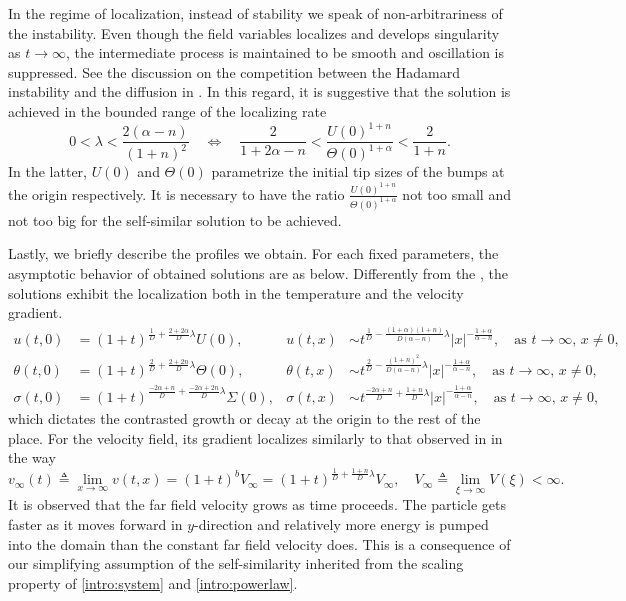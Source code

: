 \documentclass[a4paper,11pt]{article}
\begin{document}
In the regime of localization, instead of stability we speak of non-arbitrariness of the instability. Even though the field variables localizes and develops singularity as $t \rightarrow \infty$, the intermediate process is maintained to be smooth and oscillation is suppressed. See the discussion on the competition between the Hadamard instability and the diffusion in \cite{KOT14}. In this regard, it is suggestive that the solution is achieved in the bounded range of the localizing rate  
\begin{equation}\label{intro:r1posineq}
 0<\lambda < \frac{2(\alpha-n)}{(1+n)^2} \quad \Longleftrightarrow \quad \frac{2}{1+2\alpha-n} < \frac{U(0)^{1+n}}{\Theta(0)^{1+\alpha}} < \frac{2}{1+n}.
\end{equation}
In the latter, $U(0)$ and $\Theta(0)$ parametrize the initial tip sizes of the bumps at the origin respectively. It is necessary to have the ratio $\frac{U(0)^{1+n}}{\Theta(0)^{1+\alpha}}$ not too small and not too big for the self-similar solution to be achieved. 

Lastly, we briefly describe the profiles we obtain. For each fixed parameters, the asymptotic behavior of obtained solutions are as below. Differently from the \cite{bertsch_effect_1991}, the solutions exhibit the localization both in the temperature and the velocity gradient.
\begin{align*}
 u(t,0) &= (1+t)^{\frac{1}{D} + \frac{2+2\alpha}{D}\lambda}U(0),&
 u(t,x) &\sim t^{\frac{1}{D} - \frac{(1+\alpha)(1+n)}{D(\alpha-n)}\lambda}|x|^{-\frac{1+\alpha}{\alpha-n}}, \quad \text{as $t \rightarrow \infty$, $x\ne0$,}\\
 \theta(t,0) &= (1+t)^{\frac{2}{D} + \frac{2+2n}{D}\lambda}\Theta(0),&
 \theta(t,x) &\sim t^{\frac{2}{D} - \frac{(1+n)^2}{D(\alpha-n)}\lambda}|x|^{-\frac{1+\alpha}{\alpha-n}}, \quad \text{as $t \rightarrow \infty$, $x\ne0$,}\\
 \sigma(t,0) &= (1+t)^{\frac{-2\alpha+n}{D} + \frac{-2\alpha+2n}{D}\lambda}\Sigma(0), &
 \sigma(t,x) &\sim t^{\frac{-2\alpha+n}{D} +\frac{1+n}{D}\lambda}|x|^{-\frac{1+\alpha}{\alpha-n}}, \quad \text{as $t \rightarrow \infty$, $x\ne0$,}
\end{align*}
which dictates the contrasted growth or decay at the origin to the rest of the place. For the velocity field, its gradient localizes similarly to that observed in \cite{bertsch_effect_1991} in the way
$$v_\infty(t)\triangleq \lim_{x \rightarrow \infty} v(t,x)=(1+t)^{b}V_\infty = (1+t)^{\frac{1}{D} + \frac{1+n}{D}\lambda}V_\infty, \quad V_\infty \triangleq \lim_{\xi \rightarrow \infty} V(\xi) <\infty.$$
It is observed that the far field velocity grows as time proceeds. The particle gets faster as it moves forward in $y$-direction and relatively more energy is pumped into the domain than the constant far field velocity does. This is a consequence of our simplifying assumption of the self-similarity inherited from the scaling property of \eqref{intro:system} and \eqref{intro:powerlaw}.
\end{document}
